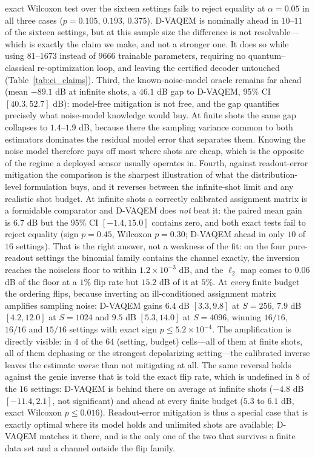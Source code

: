 \documentclass[ASNA,twocolumn]{USG}
\newcommand{\dvaqem}{D-VAQEM}
\begin{document}
exact Wilcoxon test over the sixteen settings fails to reject equality at
$\alpha=0.05$ in all three cases ($p=0.105$, $0.193$, $0.375$).  \dvaqem{} is
nominally ahead in $10$--$11$ of the sixteen settings, but at this sample size
the difference is not resolvable---which is exactly the claim we make, and not a
stronger one.  It does so while using $81$--$1673$
instead of $9666$ trainable parameters, requiring no quantum--classical
re-optimization loop, and leaving the certified decoder untouched
(Table~\ref{tab:ci_claims}).  Third, the
known-noise-model oracle remains far ahead (mean $-89.1$ dB at infinite shots,
a $46.1$ dB gap to \dvaqem{}, 95\% CI $[40.3,52.7]$ dB): model-free mitigation
is not free, and the gap quantifies precisely what noise-model knowledge would
buy.  At finite shots the same gap collapses to $1.4$--$1.9$ dB, because there
the sampling variance common to both estimators dominates the residual model
error that separates them.  Knowing the noise model therefore pays off most
where shots are cheap, which is the opposite of the regime a deployed sensor
usually operates in.  Fourth, against readout-error mitigation the comparison
is the sharpest illustration of what the distribution-level formulation buys,
and it reverses between the infinite-shot limit and any realistic shot budget.
At infinite shots a correctly calibrated assignment matrix is a formidable
comparator and \dvaqem{} does \emph{not} beat it: the paired mean gain is
$6.7$ dB but the 95\% CI $[-1.4,15.0]$ contains zero, and both exact tests
fail to reject equality (sign $p=0.45$, Wilcoxon $p=0.30$; \dvaqem{} ahead in
only $10$ of $16$ settings).  That is the right answer, not a weakness of the
fit: on the four pure-readout settings the binomial family contains the channel
exactly, the inversion reaches the noiseless floor to within $1.2\times10^{-3}$
dB, and the $\ell_2$ map comes to $0.06$ dB of the floor at a $1\%$ flip rate
but $15.2$ dB of it at $5\%$.  At \emph{every} finite budget the ordering
flips, because inverting an ill-conditioned assignment matrix amplifies
sampling noise: \dvaqem{} gains $6.4$ dB $[3.3,9.8]$ at $S=256$, $7.9$ dB
$[4.2,12.0]$ at $S=1024$ and $9.5$ dB $[5.3,14.0]$ at $S=4096$, winning
$16/16$, $16/16$ and $15/16$ settings with exact sign $p\le5.2\times10^{-4}$.
The amplification is directly visible: in $4$ of the $64$ (setting, budget)
cells---all of them at finite shots, all of them dephasing or the strongest
depolarizing setting---the calibrated inverse leaves the estimate \emph{worse}
than not mitigating at all.  The same reversal holds against the genie inverse
that is told the exact flip rate, which is undefined in $8$ of the $16$
settings: \dvaqem{} is behind there on average at infinite shots ($-4.8$ dB
$[-11.4,2.1]$, not significant) and ahead at every finite budget ($5.3$ to
$6.1$ dB, exact Wilcoxon $p\le0.016$).  Readout-error mitigation is thus a
special case that is exactly optimal where its model holds and unlimited shots
are available; \dvaqem{} matches it there, and is the only one of the two that
survives a finite data set and a channel outside the flip family.
\end{document}
